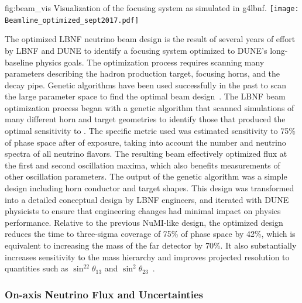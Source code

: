 \begin{dunefigure}{fig:beam_vis}
{Visualization of the focusing system as simulated in g4lbnf.}
    \texttt{[image: Beamline\_optimized\_sept2017.pdf]}\end{dunefigure}


The optimized LBNF neutrino beam design is the result of several years of effort by LBNF and DUNE to identify a focusing system optimized to DUNE's long-baseline physics goals.  The optimization process requires scanning many parameters describing the hadron production target, focusing horns, and the decay pipe. Genetic algorithms have been used successfully in the past to scan the large parameter space to find the optimal beam design~\cite{Calviani:2014cxa}. The  LBNF beam optimization process began with a genetic algorithm that scanned simulations of many different horn and target geometries to identify those that produced the optimal sensitivity to .  The specific metric used was estimated sensitivity to 75\% of  phase space after   %
of exposure, taking into account the number and neutrino spectra of all neutrino flavors. The resulting beam effectively optimized flux at the first and second oscillation maxima, which also benefits measurements of other oscillation parameters.  The output of the genetic algorithm was a simple design including horn conductor and target shapes.  This design was transformed into a detailed conceptual design by LBNF engineers, and iterated with DUNE physicists to ensure that engineering changes had minimal impact on physics performance.  Relative to the previous NuMI-like design, the optimized design reduces the time to three-sigma coverage of 75\% of  phase space by 42\%, which is equivalent to increasing the mass of the far detector by 70\%.  It also substantially increases sensitivity to the mass hierarchy and improves projected resolution to quantities such as $\sin^22\theta_{13}$ and $\sin^2\theta_{23}$~\cite{fields_doc_2901}.        

\subsubsection{On-axis Neutrino Flux and Uncertainties}


